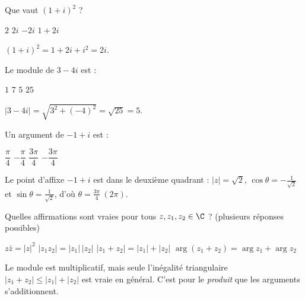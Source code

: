
\begin{question}
Que vaut $(1+i)^2$ ?
\begin{reponses}
  \mauvaise $2$
  \bonne $2i$
  \mauvaise $-2i$
  \mauvaise $1+2i$
\end{reponses}
\begin{explication}
$(1+i)^2=1+2i+i^2=2i$.
\end{explication}
\end{question}

\begin{question}
Le module de $3-4i$ est :
\begin{reponses}
  \mauvaise $1$
  \mauvaise $7$
  \bonne $5$
  \mauvaise $25$
\end{reponses}
\begin{explication}
$|3-4i|=\sqrt{3^2+(-4)^2}=\sqrt{25}=5$.
\end{explication}
\end{question}

\begin{question}
Un argument de $-1+i$ est :
\begin{reponses}
  \mauvaise $\dfrac{\pi}{4}$
  \mauvaise $-\dfrac{\pi}{4}$
  \bonne $\dfrac{3\pi}{4}$
  \mauvaise $-\dfrac{3\pi}{4}$
\end{reponses}
\begin{explication}
Le point d'affixe $-1+i$ est dans le deuxième quadrant : $|z|=\sqrt2$, $\cos\theta=-\frac{1}{\sqrt2}$ et $\sin\theta=\frac1{\sqrt2}$, d'où $\theta=\frac{3\pi}{4}\ (2\pi)$.
\end{explication}
\end{question}

\begin{question}
Quelles affirmations sont vraies pour tous $z,z_1,z_2\in\C$ ? (plusieurs réponses possibles)
\begin{reponses}
  \bonne $z\bar z=|z|^2$
  \bonne $|z_1z_2|=|z_1|\,|z_2|$
  \mauvaise $|z_1+z_2|=|z_1|+|z_2|$
  \mauvaise $\arg(z_1+z_2)=\arg z_1+\arg z_2$
\end{reponses}
\begin{explication}
Le module est multiplicatif, mais seule l'inégalité triangulaire $|z_1+z_2|\le|z_1|+|z_2|$ est vraie en général. C'est pour le \emph{produit} que les arguments s'additionnent.
\end{explication}
\end{question}

